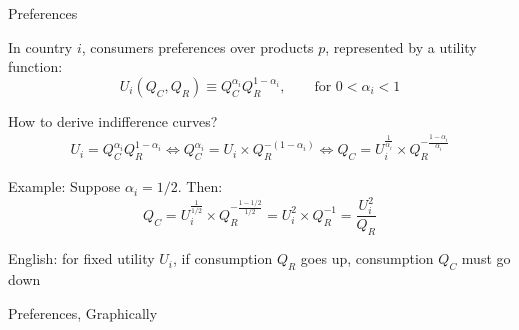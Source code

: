 \documentclass[notes,11pt, aspectratio=169, xcolor=table]{beamer}
\newenvironment{wideitemize}{\itemize\addtolength{\itemsep}{10pt}}{\enditemize}
\begin{document}
\begin{frame}{Preferences}
\begin{wideitemize}
        \item In country $i$, consumers preferences over products $p$, represented by a utility function:
        \begin{equation*}
            U_i(Q_C,Q_R) \equiv Q_C^{\alpha_i} Q_R^{1-\alpha_i}, \qquad \text{for } 0 < \alpha_i < 1   
        \end{equation*}
        \item How to derive indifference curves?
        \begin{eqnarray*}
            U_i = Q_C^{\alpha_i} Q_R^{1-\alpha_i} \iff Q_C^{\alpha_i} = U_i \times Q_R^{-(1-\alpha_i)} \iff Q_C = U_i^{\frac{1}{\alpha_i}} \times Q_R^{-\frac{1-\alpha_i}{\alpha_i}} 
        \end{eqnarray*}
        \item Example: Suppose $\alpha_i=1/2$. Then:
        \begin{equation*}
            Q_C = U_i^{\frac{1}{1/2}} \times Q_R^{-\frac{1-1/2}{1/2}} = U_i^{2} \times Q_R^{-1} = \frac{U_i^{2}}{Q_R} 
        \end{equation*}
        \item English: for fixed utility $U_i$, if consumption $Q_R$ goes up, consumption $Q_C$ must go down
    \end{wideitemize}
\end{frame}



\begin{frame}{Preferences, Graphically}

\begin{figure}[htbp]


\end{figure}

\end{frame}
\end{document}
